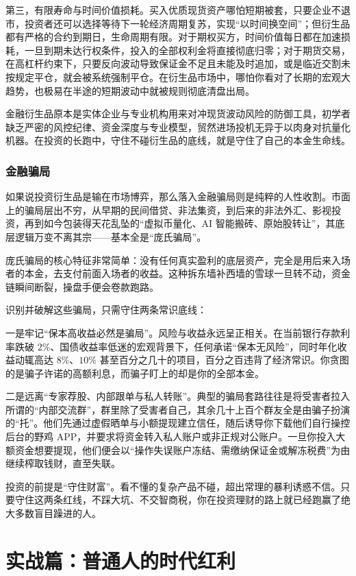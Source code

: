 \documentclass[12pt,openany]{book}
\begin{document}
第三，有限寿命与时间价值损耗。买入优质现货资产哪怕短期被套，只要企业不退市，投资者还可以选择等待下一轮经济周期复苏，实现“以时间换空间”；但衍生品都有严格的合约到期日，生命周期有限。对于期权买方，时间价值每日都在加速损耗，一旦到期未达行权条件，投入的全部权利金将直接彻底归零；对于期货交易，在高杠杆约束下，只要反向波动导致保证金不足且未能及时追加，或是临近交割未按规定平仓，就会被系统强制平仓。在衍生品市场中，哪怕你看对了长期的宏观大趋势，也极易在半途的短期波动中就被规则彻底清盘出局。

金融衍生品原本是实体企业与专业机构用来对冲现货波动风险的防御工具，初学者缺乏严密的风控纪律、资金深度与专业模型，贸然进场投机无异于以肉身对抗量化机器。在投资的长跑中，守住不碰衍生品的底线，就是守住了自己的本金生命线。

\subsection{金融骗局}

如果说投资衍生品是输在市场博弈，那么落入金融骗局则是纯粹的人性收割。市面上的骗局层出不穷，从早期的民间借贷、非法集资，到后来的非法外汇、影视投资，再到如今包装得天花乱坠的“虚拟币量化、AI 智能搬砖、原始股转让”，其底层逻辑万变不离其宗——基本全是“庞氏骗局”。

庞氏骗局的核心特征非常简单：没有任何真实盈利的底层资产，完全是用后来入场者的本金，去支付前面入场者的收益。这种拆东墙补西墙的雪球一旦转不动，资金链瞬间断裂，操盘手便会卷款跑路。

识别并破解这些骗局，只需守住两条常识底线：

一是牢记“保本高收益必然是骗局”。风险与收益永远呈正相关。在当前银行存款利率跌破 $2\%$、国债收益率低迷的宏观背景下，任何承诺“保本无风险”，同时年化收益动辄高达 $8\%$、$10\%$ 甚至百分之几十的项目，百分之百违背了经济常识。你贪图的是骗子许诺的高额利息，而骗子盯上的却是你的全部本金。

二是远离“专家荐股、内部跟单与私人转账”。典型的骗局套路往往是将受害者拉入所谓的“内部交流群”，群里除了受害者自己，其余几十上百个群友全是由骗子扮演的“托”。他们先通过虚假晒单与小额提现建立信任，随后诱导你下载他们自行操控后台的野鸡 APP，并要求将资金转入私人账户或非正规对公账户。一旦你投入大额资金想要提现，他们便会以“操作失误账户冻结、需缴纳保证金或解冻税费”为由继续榨取钱财，直至失联。

投资的前提是“守住财富”。看不懂的复杂产品不碰，超出常理的暴利诱惑不信。只要守住这两条红线，不踩大坑、不交智商税，你在投资理财的路上就已经跑赢了绝大多数盲目躁进的人。


\chapter{实战篇：普通人的时代红利}
\end{document}
